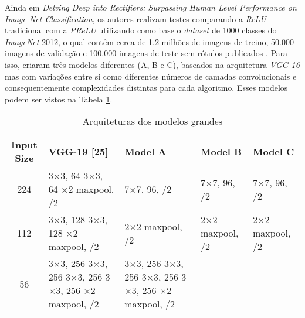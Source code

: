 Ainda em \textit{Delving Deep into Rectifiers: Surpassing Human Level Performance on Image Net Classification}, os autores realizam testes comparando a \textit{ReLU} tradicional com a \textit{PReLU} utilizando como base o \textit{dataset} de 1000 classes do \textit{ImageNet} 2012, o qual contêm cerca de 1.2 milhões de imagens de treino, 50.000 imagens de validação e 100.000 imagens de teste sem rótulos publicados \parencite{PReLUArticle}. Para isso, \textcite{PReLUArticle} criaram três modelos diferentes (A, B e C), baseados na arquitetura \textit{VGG-16} mas com variações entre si como diferentes números de camadas convolucionais e consequentemente complexidades distintas para cada algoritmo. Esses modelos podem ser vistos na Tabela \ref{tab:arquitetura-prelu}. 

\begin{table}
    \centering
    \begin{threeparttable}
        \caption{Arquiteturas dos modelos grandes}
        \label{tab:arquitetura-prelu}
        \begin{tabular}{cllll}
            \toprule
            \textbf{Input Size} & \textbf{VGG-19 [25]} & \textbf{Model A} & \textbf{Model B} & \textbf{Model C} \\
            \midrule
            224
              & \makecell[l]{3$\times$3, 64 \\ 3$\times$3, 64 \\ \addlinespace 2$\times$2 maxpool, /2}
              & 7$\times$7, 96, /2
              & 7$\times$7, 96, /2
              & 7$\times$7, 96, /2 \\
            \midrule
            112
              & \makecell[l]{3$\times$3, 128 \\ 3$\times$3, 128 \\ \addlinespace 2$\times$2 maxpool, /2}
              & 2$\times$2 maxpool, /2
              & 2$\times$2 maxpool, /2
              & 2$\times$2 maxpool, /2 \\
            \midrule
            56
              & \makecell[l]{3$\times$3, 256 \\ 3$\times$3, 256 \\ 3$\times$3, 256 \\ 3$\times$3, 256 \\ \addlinespace 2$\times$2 maxpool, /2}
              & \makecell[l]{3$\times$3, 256 \\ 3$\times$3, 256 \\ 3$\times$3, 256 \\ 3$\times$3, 256 \\ \addlinespace 2$\times$2 maxpool, /2}

\end{tabular}
\end{threeparttable}
\end{table}

